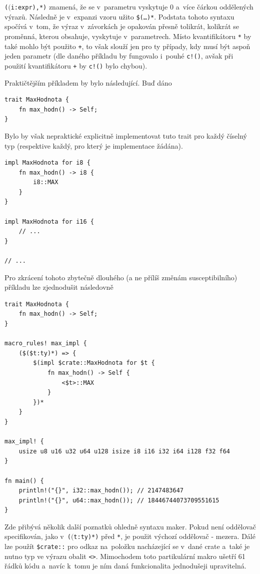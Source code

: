 \documentclass[a4paper, 12pt]{article} %
\newcommand{\rust}[1]{\texttt{#1}}
\begin{document}
			\rust{($($i:expr),*)} znamená, že se v~parametru vyskytuje 0 a~více čárkou oddělených výrazů. Následně je v~expanzi vzoru užito \texttt{\$(\dots)*}. Podstata tohoto syntaxu spočívá v~tom, že výraz v~závorkách je opakován přesně tolikrát, kolikrát se proměnná, kterou obsahuje, vyskytuje v~parametrech. Místo kvantifikátoru \rust{*} by také mohlo být použito \rust{+}, to však slouží jen pro ty případy, kdy musí být aspoň jeden parametr (dle daného příkladu by fungovalo i~pouhé \rust{c!()}, avšak při použití kvantifikátoru \rust{+} by \rust{c!()} bylo chybou).
			
			Praktičtějším příkladem by bylo následující. Buď dáno
			\begin{verbatim}
trait MaxHodnota {
	fn max_hodn() -> Self;
}
			\end{verbatim}
			
			Bylo by však nepraktické explicitně implementovat tuto trait pro každý číselný typ (respektive každý, pro který je implementace žádána).
			\begin{verbatim}
impl MaxHodnota for i8 {
	fn max_hodn() -> i8 {
		i8::MAX
	}
}

impl MaxHodnota for i16 {
	// ...
}

// ...
			\end{verbatim}
			
			Pro zkrácení tohoto zbytečně dlouhého (a ne přílíš změnám susceptibilního) příkladu lze zjednodušit následovně
			\begin{verbatim}
trait MaxHodnota {
	fn max_hodn() -> Self;
}

macro_rules! max_impl {
	($($t:ty)*) => {
		$(impl $crate::MaxHodnota for $t {
			fn max_hodn() -> Self {
				<$t>::MAX
			}
		})*
	}
}

max_impl! {
	usize u8 u16 u32 u64 u128 isize i8 i16 i32 i64 i128 f32 f64
}

fn main() {
	println!("{}", i32::max_hodn()); // 2147483647
	println!("{}", u64::max_hodn()); // 18446744073709551615
}
			\end{verbatim}
			
			Zde přibývá několik další poznatků ohledně syntaxu maker. Pokud není oddělovač specifikován, jako v~\rust{($($t:ty)*)} před \rust{*}, je použit výchozí oddělovač - mezera. Dálé lze použít \texttt{\$crate::} pro odkaz na~položku nacházející se v~dané crate a~také je nutno typ ve výrazu obalit \rust{<>}. Mimochodem toto partikulární makro ušetří 61 řádků kódu a~navíc k~tomu je ním daná funkcionalita jednodušeji upravitelná.\cite{dekl_makra}
\end{document}

